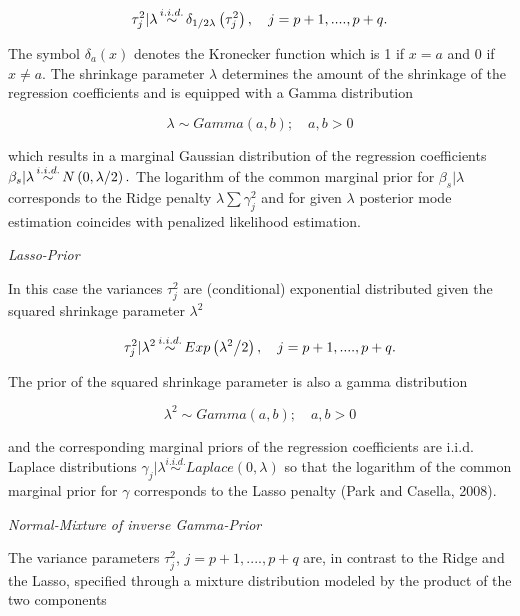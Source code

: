 \documentclass[11pt,a4paper,twoside]{bayesxarticle}
\begin{document}
\begin{equation} 
\label{ZEqnNum108379} 
\tau _{j}^{2} |\lambda \mathop{\sim }\limits^{i.i.d.} \delta _{{1\mathord{\left/ 
{\vphantom {1 2\lambda }} \right. \kern-\nulldelimiterspace} 2\lambda } } \left(
\tau _{j}^{2} \right),\quad j=p+1,....,p+q.  
\end{equation} 

The symbol $\delta _{a} (x)$ denotes the Kronecker function which is 1 if $x=a$ and 
0 if $x\ne a$. The shrinkage parameter $\lambda $ determines the amount of the shrinkage 
of the regression coefficients and is equipped with a Gamma distribution

\[\lambda \sim Gamma\left(a,b\right);\quad a,b>0\] 

which results in a marginal Gaussian distribution of the regression coefficients $\beta 
_{s} |\lambda \mathop{\sim }\limits^{i.i.d.} N\left(0,{\lambda \mathord{\left/ {
\vphantom {\lambda  2}} \right. \kern-\nulldelimiterspace} 2} \right).$ The logarithm 
of the common marginal prior for $\beta _{s} |\lambda $ corresponds to the Ridge 
penalty $\lambda \sum \gamma _{j}^{2}  $ and for given $\lambda $ posterior mode 
estimation coincides with penalized likelihood estimation.

{\em Lasso-Prior}

In this case the variances $\tau _{j}^{2} $ are (conditional) exponential distributed 
given the squared shrinkage parameter $\lambda ^{2} $

\begin{equation} 
\label{ZEqnNum508369} 
\tau _{j}^{2} |\lambda ^{2} \mathop{\sim }\limits^{i.i.d.} Exp\left({\lambda ^{2} 
\mathord{\left/ {\vphantom {\lambda ^{2}  2}} \right. \kern-\nulldelimiterspace} 
2} \right),\quad j=p+1,....,p+q.  
\end{equation} 

The prior of the squared shrinkage parameter is also a gamma distribution

\[\lambda ^{2} \sim Gamma\left(a,b\right);\quad a,b>0\] 

and the corresponding marginal priors of the regression coefficients are i.i.d. Laplace 
distributions $\gamma _{j} |\lambda \mathop{\sim }\limits^{i.i.d.} Laplace\left(0,
\lambda \right)$ so that the logarithm of the common marginal prior for $\gamma $ corresponds 
to the Lasso penalty (Park and Casella, 2008).

{\em Normal-Mixture of inverse Gamma-Prior}

The variance parameters $\tau _{j}^{2} $, $j=p+1,....,p+q$ are, in contrast 
to the Ridge and the Lasso, specified through a mixture distribution modeled by the 
product of the two components 
\end{document}
